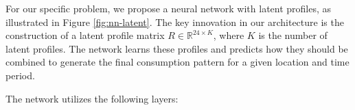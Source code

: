 For our specific problem, we propose a neural network with latent profiles, as illustrated in Figure \ref{fig:nn-latent}. The key innovation in our architecture is the construction of a latent profile matrix $R \in \mathbb{R}^{24 \times K}$, where $K$ is the number of latent profiles. The network learns these profiles and predicts how they should be combined to generate the final consumption pattern for a given location and time period.


\newpage

The network utilizes the following layers:

\newcommand{\nnmodule}[3]{%
    \begin{marginfigure}[1cm]
        \centering
        \texttt{[image: \#2]}
    \end{marginfigure}
    \item \textbf{#1} \\
    #3
    \vspace{2mm}
}


